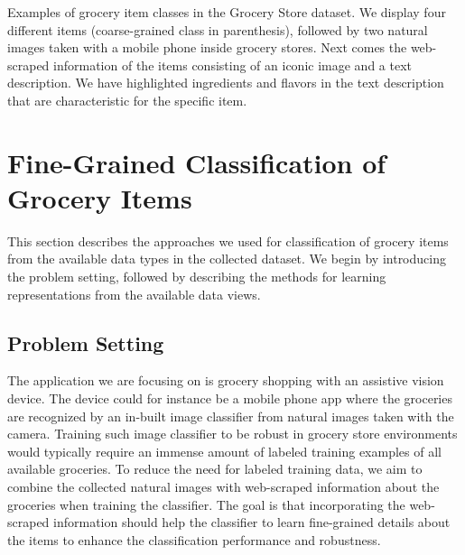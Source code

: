 \begin{table}[t]
	\centering
	\caption{\small{ Examples of grocery item classes in the Grocery Store dataset. We display four different items (coarse-grained class in parenthesis), followed by two natural images taken with a mobile phone inside grocery stores. Next comes the web-scraped information of the items consisting of an iconic image and a text description. We have highlighted ingredients and flavors in the text description that are characteristic for the specific item. }}
	\vspace{-10pt}
	\setlength{\fboxsep}{0pt} 
	\setlength{\fboxrule}{0.33pt}
	
	\label{tab:grocery_store_dataset}
\end{table}

\section{Fine-Grained Classification of Grocery Items}\label{chap3:sec:fgr_of_grocery_items}

This section describes the approaches we used for classification of grocery items from the available data types in the collected dataset. We begin by introducing the problem setting, followed by describing the methods for learning representations from the available data views. 

\subsection{Problem Setting}

The application we are focusing on is grocery shopping with an assistive vision device. The device could for instance be a mobile phone app where the groceries are recognized by an in-built image classifier from natural images taken with the camera. Training such image classifier to be robust in grocery store environments would typically require an immense amount of labeled training examples of all available groceries. To reduce the need for labeled training data, we aim to combine the collected natural images with web-scraped information about the groceries when training the classifier. The goal is that incorporating the web-scraped information should help the classifier to learn fine-grained details about the items to enhance the classification performance and robustness. 

